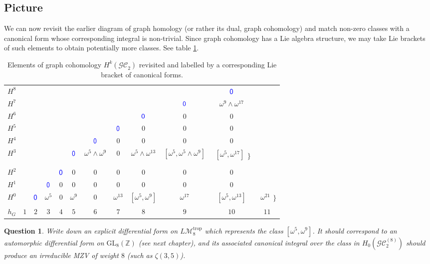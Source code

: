 \documentclass[12pt]{amsart}
\newcommand{\ZZ}{{\mathbb Z}}
\theoremstyle{plain}
\newtheorem{quest}[thm]{Question}
\newcommand{\LM}{L\mathcal{M}}
\newcommand{\GL}{\mathrm{GL}}
\newcommand{\trop}{\mathrm{trop}}
\newcommand{\GC}{\mathcal{GC}}
\newcommand{\0}{\color{blue}{\mathsf{0}}}
\begin{document}
 \subsection{Picture} We can now revisit the earlier diagram of graph homology (or rather its dual, graph cohomology) and match non-zero classes with a canonical form whose corresponding integral is non-trivial.  Since graph cohomology has a Lie algebra structure, we may take Lie brackets of such elements to obtain potentially more classes.  See table \ref{table:knownrevisited}. 
 
 
\begin{table}[h]
\begin{center}
\vspace{0.1in} 
\begin{tabular}{c|ccccccccccc}
$H^8$ &&&&&&&&&& $\0$   \\
$H^7$ &&&&&&&&& $\0$& $\omega^9\wedge \omega^{17}$   \\
$H^6$ &&&&&&&& $\0$ & 0& 0 \\
$H^5$ &&&&&&& $\0$ &  0 & 0& 0 \\
$H^4$ &&&&&&  $\0$ &  0 &  0& 0 &0\\
$H^3$ &&&&& $\0$ & $\omega^5 \wedge \omega^9$   & 0&  $\omega^5 \wedge \omega^{13}$ & $[\omega^5, \omega^5\wedge \omega^9]$ &  $ \substack{ [\omega^5,\omega^{17}] \\  [\omega^9,\omega^{13}] } \}$    \\
$H^2$ &&&& $\0$ & 0&0 & 0 & 0  & 0 & 0 \\
$H^1$ &&& $\0$ & 0 & 0 & 0 & 0 & 0 & 0 &  0 \\
$H^0$ && $\0$ & $\omega^5$  & 0& $\omega^9$ &0  & $\omega^{13}$ &   $[\omega^5,\omega^9] $ & $\omega^{17}$ &  $[\omega^5,\omega^{13}] $ &   $\substack{ \omega^{21} \\  [\omega^5,[\omega^5,\omega^9]]} \}$\\ 
\hline  
$h_G$ & $1$  & $2$ & $3$ & $4$ & $5$ & $6$ & $7$ & $8$& $9$& $10$ & $11$
\end{tabular}
\vspace{0.2in} 
\end{center}
\caption{Elements of graph cohomology $H^k(\GC_2)$  revisited and labelled by a corresponding Lie bracket of canonical forms.
 } 
\label{default}\label{table:knownrevisited} 
\end{table}
 \begin{quest} Write down an explicit differential form on $\LM_8^{\trop}$ which represents the class $[\omega^5,\omega^9]$.  It should correspond to an automorphic differential form on $\GL_8(\ZZ)$ (see next chapter), and its associated canonical integral over the class in $H_0(\GC_2^{(8)})$ should produce an irreducible MZV of weight $8$ (such as  $\zeta(3,5)$). 
 \end{quest} 
\end{document}
